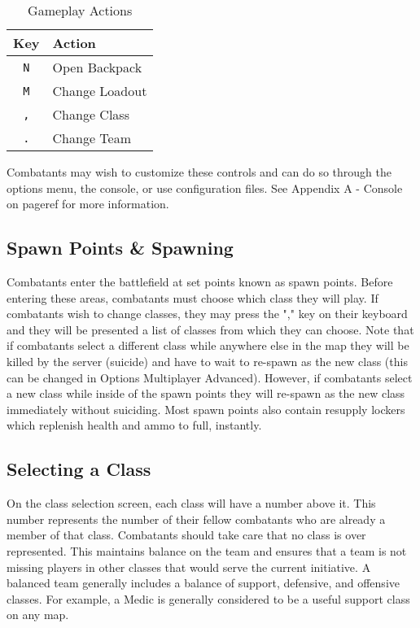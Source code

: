 \begin{table}[h!b!p!]
\caption{Gameplay Actions}
\begin{center}
\begin{tabular}{|c|l|}
	\hline
		Key & Action\\
	\hline
	\texttt{N}&Open Backpack\\
	\texttt{M}&Change Loadout\\
	\texttt{,}&Change Class\\
	\texttt{.}&Change Team\\
  	\hline
\end{tabular}
\end{center}
\label{table_gameplay_actions}
\end{table}

Combatants may wish to customize these controls and can do so through the options menu, the console, or use configuration files. See Appendix A - Console on {{pageref}} for more information.

\subsection{Spawn Points \& Spawning}
Combatants enter the battlefield at set points known as spawn points. Before entering these areas, combatants must choose which class they will play. If combatants wish to change classes, they may press the "," key on their keyboard and they will be presented a list of classes from which they can choose. Note that if combatants select a different class while anywhere else in the map they will be killed by the server (suicide) and have to wait to re-spawn as the new class (this can be changed in Options Multiplayer Advanced). However, if combatants select a new class while inside of the spawn points they will re-spawn as the new class immediately without suiciding. Most spawn points also contain resupply lockers which replenish health and ammo to full, instantly.

\subsection{Selecting a Class}
On the class selection screen, each class will have a number above it. This number represents the number of their fellow combatants who are already a member of that class. Combatants should take care that no class is over represented.  This maintains balance on the team and ensures that a team is not missing players in other classes that would serve the current initiative. A balanced team generally includes a balance of support, defensive, and offensive classes. For example, a Medic is generally considered to be a useful support class on any map.

